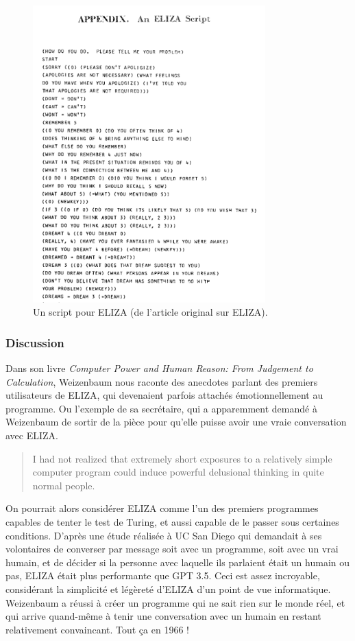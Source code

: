 \documentclass[11pt, a4paper]{report}
\begin{document}
  \begin{figure}[h]
    \centering
    \includegraphics[width=0.8\textwidth]{eliza-script-example.png}
    \caption{Un script pour ELIZA (de l'article original sur ELIZA).}
    \label{fig:eliza-script}
  \end{figure}

      \subsubsection{Discussion}
Dans son livre \textit{Computer Power and Human Reason: From Judgement to Calculation}, 
Weizenbaum nous raconte des anecdotes parlant des premiers utilisateurs de ELIZA, 
qui devenaient parfois attachés émotionnellement au programme. Ou l'exemple de sa 
secrétaire, qui a apparemment demandé à Weizenbaum de sortir de la pièce pour qu'elle 
puisse avoir une vraie conversation avec ELIZA.  

\begin{quote}
  I had not realized that extremely short exposures to a relatively simple computer program could 
  induce powerful delusional thinking in quite normal people.
  \cite{weizenbaum-book}
\end{quote}

On pourrait alors considérer ELIZA comme l'un des premiers programmes capables de tenter 
le test de Turing, et aussi capable de le passer sous certaines conditions. 
D'après une étude réalisée à UC San Diego \cite{eliza-gpt} qui demandait à ses volontaires de converser 
par message soit avec un programme, soit avec un vrai humain, et de décider si la personne 
avec laquelle ils parlaient était un humain ou pas, ELIZA était plus performante que GPT 3.5. 
Ceci est assez incroyable, considérant la simplicité et légèreté d'ELIZA d'un point de vue 
informatique. Weizenbaum a réussi à créer un programme qui ne sait rien sur le monde réel, 
et qui arrive quand-même à tenir une conversation avec un humain en restant relativement 
convaincant. Tout ça en 1966 ! 
\end{document}
